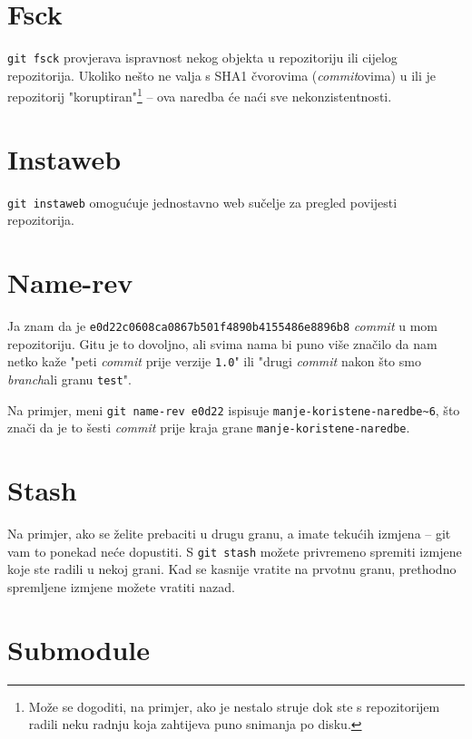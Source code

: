 \section*{Fsck}

\verb+git fsck+ provjerava ispravnost nekog objekta u repozitoriju ili cijelog repozitorija.
Ukoliko nešto ne valja s SHA1 čvorovima (\emph{commit}ovima) u ili je repozitorij "koruptiran"\footnote{Može se dogoditi, na primjer, ako je nestalo struje dok ste s repozitorijem radili neku radnju koja zahtijeva puno snimanja po disku.} -- ova naredba će naći sve nekonzistentnosti.

\section*{Instaweb}

\verb+git instaweb+ omogućuje jednostavno web sučelje za pregled povijesti repozitorija.

\section*{Name-rev}

Ja znam da je \verb+e0d22c0608ca0867b501f4890b4155486e8896b8+ \emph{commit} u mom repozitoriju.
Gitu je to dovoljno, ali svima nama bi puno više značilo da nam netko kaže "peti \emph{commit} prije verzije \verb+1.0+" ili "drugi \emph{commit} nakon što smo \emph{branch}ali granu \verb+test+".

Na primjer, meni \verb+git name-rev e0d22+ ispisuje \verb+manje-koristene-naredbe~6+, što znači da je to šesti \emph{commit} prije kraja grane \verb+manje-koristene-naredbe+.

\section*{Stash}

Na primjer, ako se želite prebaciti u drugu granu, a imate tekućih izmjena -- git vam to ponekad neće dopustiti.
S \verb+git stash+ možete privremeno spremiti izmjene koje ste radili u nekoj grani.
Kad se kasnije vratite na prvotnu granu, prethodno spremljene izmjene možete vratiti nazad.

\section*{Submodule}

